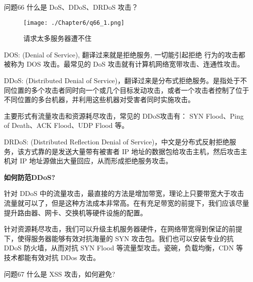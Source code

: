 \documentclass[cn,11pt,color=blue,lang=cn]{elegantbook}
\begin{document}
\begin{custom}{问题66}
什么是 DoS、DDoS、DRDoS 攻击？
\end{custom}
\begin{solution}
\begin{figure}[!h]
\centering
\texttt{[image: ./Chapter6/q66\_1.png]}
\caption{请求太多服务器遭不住}
\label{fig66_1}
\end{figure}

DOS: (Denial of Service), 翻译过来就是拒绝服务, 一切能引起拒绝 行为的攻击都被称为 DOS 攻击。最常见的 DoS 攻击就有计算机网络宽带攻击、连通性攻击。

DDoS: (Distributed Denial of Service)，翻译过来是分布式拒绝服务。是指处于不同位置的多个攻击者同时向一个或几个目标发动攻击，或者一个攻击者控制了位于不同位置的多台机器，并利用这些机器对受害者同时实施攻击。

主要形式有流量攻击和资源耗尽攻击，常见的 DDoS攻击有： SYN Flood、Ping of Death、ACK Flood、UDP Flood 等。

DRDoS: (Distributed Reflection Denial of Service)，中文是分布式反射拒绝服务，该方式靠的是发送大量带有被害者 IP 地址的数据包给攻击主机，然后攻击主机对 IP 地址源做出大量回应，从而形成拒绝服务攻击。

\begin{note} \textbf{如何防范DDoS?} \end{note}
针对 DDoS 中的流量攻击，最直接的方法是增加带宽，理论上只要带宽大于攻击流量就可以了，但是这种方法成本非常高。在有充足带宽的前提下，我们应该尽量提升路由器、网卡、交换机等硬件设施的配置。

针对资源耗尽攻击，我们可以升级主机服务器硬件，在网络带宽得到保证的前提下，使得服务器能够有效对抗海量的 SYN 攻击包。我们也可以安装专业的抗 DDoS 防火墙，从而对抗 SYN Flood 等流量型攻击。瓷碗，负载均衡，CDN 等技术都能有效对抗 DDos 攻击。
\end{solution}


\begin{custom}{问题67}
什么是 XSS 攻击，如何避免?
\end{custom}
\end{document}
